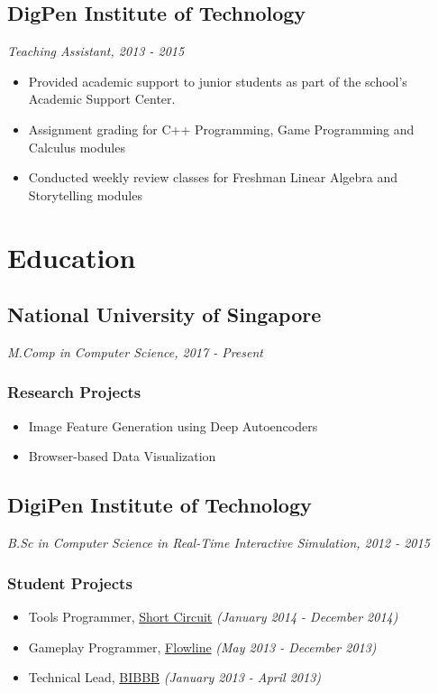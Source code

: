 \documentclass[letterpaper,11pt]{article}
\begin{document}
\subsection{DigPen Institute of Technology}
\textit{{\small Teaching Assistant, 2013 - 2015}}

\begin{itemize}
    \item Provided academic support to junior students as part of the school’s Academic Support Center. 
    \item Assignment grading for C++ Programming, Game Programming and Calculus modules
    \item Conducted weekly review classes for Freshman Linear Algebra and Storytelling modules
\end{itemize}


\section{Education}

\subsection{National University of Singapore}
\textit{{\small M.Comp in Computer Science, 2017 - Present}}

\subsubsection{Research Projects}
\begin{itemize}
    \item Image Feature Generation using Deep Autoencoders
    \item Browser-based Data Visualization
\end{itemize}

\subsection{DigiPen Institute of Technology}
\textit{{\small B.Sc in Computer Science in Real-Time Interactive Simulation, 2012 - 2015}}

\subsubsection{Student Projects}
\begin{itemize}
    \item Tools Programmer, \href{http://games.digipen.edu/games/shortcircuit}{Short Circuit} \textit{(January 2014 - December 2014)}
    \item Gameplay Programmer, \href{http://games.digipen.edu/games/flowline}{Flowline} \textit{(May 2013 - December 2013)}
    \item Technical Lead, \href{http://games.digipen.edu/games/bibbb}{BIBBB} \textit{(January 2013 - April 2013)}
\end{itemize}
\end{document}
